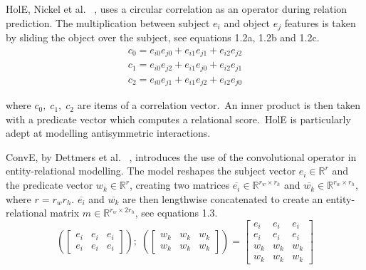 \noindent HolE, Nickel et al. \unskip~\citep{nickel2016holographic}, uses a circular correlation as an operator during relation prediction. The multiplication between subject $ e_i $ and object $ e_j $ features is taken by sliding the object over the subject, see equations 1.2a, 1.2b and 1.2c. 
\begin{subequations}
	\begin{gather}
		c_0 =  e_{i0}e_{j0} + e_{i1}e_{j1} + e_{i2}e_{j2} \\
		c_1 =  e_{i0}e_{j2} + e_{i1}e_{j0} + e_{i2}e_{j1} \\
		c_2 =  e_{i0}e_{j1} + e_{i1}e_{j2} + e_{i2}e_{j0} 
	\end{gather}
\end{subequations}

\noindent where $ c_0, \; c_1, \; c_2 $ are items of a correlation vector.\ An inner product is then taken with a predicate vector which computes a relational score.\ HolE is particularly adept at modelling antisymmetric interactions. \par

\noindent ConvE, by Dettmers et al. \unskip~\citep{dettmers2018convolutional}, introduces the use of the convolutional operator in entity-relational modelling. The model reshapes the subject vector $ e_i \in \mathbb{R}^{r} $ and the predicate vector $ w_k \in \mathbb{R}^{r} $, creating two matrices $ \overline{e_i} \in \mathbb{R}^{r_w \times r_h} $ and $ \overline{w_k} \in \mathbb{R}^{r_w \times r_h} $, where $ r = r_wr_h $. $ \overline{e_i} $ and $ \overline{w_k} $ are then lengthwise concatenated to create an entity-relational matrix $ m \in \mathbb{R}^{r_w \times 2r_h} $, see equations 1.3.
\begin{equation}
	(\begin{bmatrix}
        		e_i & e_i & e_i \\
           	e_i & e_i & e_i 
       	\end{bmatrix}); \; (\begin{bmatrix}
        					w_k & w_k & w_k \\
           	                         w_k & w_k & w_k 
       				\end{bmatrix}) = \begin{bmatrix}
        								e_i & e_i & e_i \\
           	                                                  e_i & e_i & e_i \\
           							w_k & w_k & w_k \\
           	                                                  w_k & w_k & w_k 
        			     				\end{bmatrix}
\end{equation}

